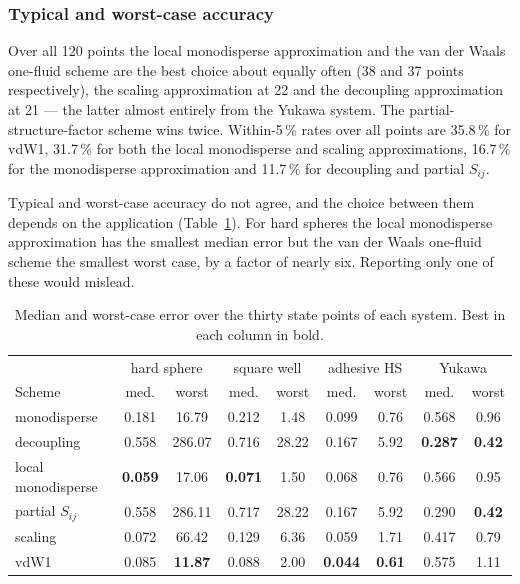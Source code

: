 \subsubsection{Typical and worst-case accuracy}

Over all 120 points the local monodisperse approximation and the van der Waals
one-fluid scheme are the best choice about equally often (38 and 37 points
respectively), the scaling approximation at 22 and the decoupling
approximation at 21 --- the latter almost entirely from the Yukawa system. The
partial-structure-factor scheme wins twice. Within-5\,\% rates over all
points are 35.8\,\% for vdW1, 31.7\,\% for both the local monodisperse and
scaling approximations, 16.7\,\% for the monodisperse approximation and
11.7\,\% for decoupling and partial $S_{ij}$.

Typical and worst-case accuracy do not agree, and the choice between them
depends on the application (Table~\ref{tab:schemestats}). For hard spheres the
local monodisperse approximation has the smallest median error but the van der
Waals one-fluid scheme the smallest worst case, by a factor of nearly six.
Reporting only one of these would mislead.

\begin{table}[htbp]
\centering
\caption{Median and worst-case error over the thirty state points of each
system. Best in each column in bold.}
\label{tab:schemestats}
\small
\begin{tabular}{lcccccccc}
\toprule
& \multicolumn{2}{c}{hard sphere} & \multicolumn{2}{c}{square well}
& \multicolumn{2}{c}{adhesive HS} & \multicolumn{2}{c}{Yukawa}\\
Scheme & med. & worst & med. & worst & med. & worst & med. & worst\\
\midrule
monodisperse       & 0.181 & 16.79 & 0.212 & 1.48 & 0.099 & 0.76 & 0.568 & 0.96\\
decoupling         & 0.558 & 286.07 & 0.716 & 28.22 & 0.167 & 5.92 & \textbf{0.287} & \textbf{0.42}\\
local monodisperse & \textbf{0.059} & 17.06 & \textbf{0.071} & 1.50 & 0.068 & 0.76 & 0.566 & 0.95\\
partial $S_{ij}$   & 0.558 & 286.11 & 0.717 & 28.22 & 0.167 & 5.92 & 0.290 & \textbf{0.42}\\
scaling            & 0.072 & 66.42 & 0.129 & 6.36 & 0.059 & 1.71 & 0.417 & 0.79\\
vdW1               & 0.085 & \textbf{11.87} & 0.088 & 2.00 & \textbf{0.044} & \textbf{0.61} & 0.575 & 1.11\\
\bottomrule
\end{tabular}
\end{table}

